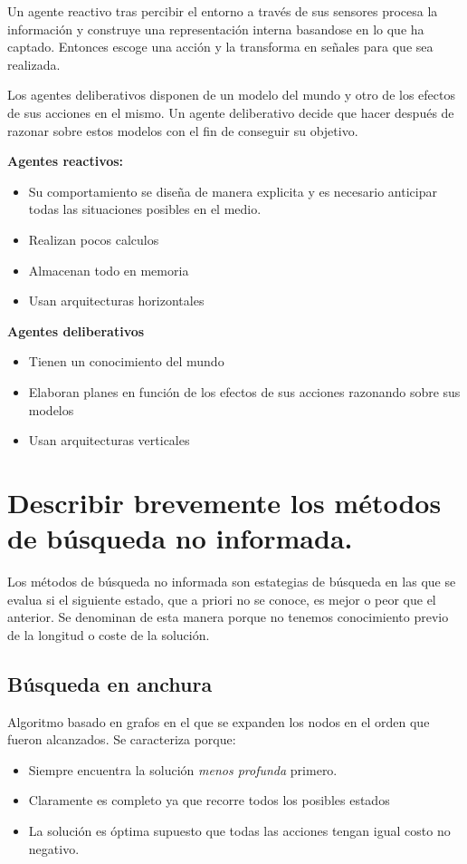 \documentclass[12pt]{article}
\begin{document}
Un agente reactivo tras percibir el entorno a través de sus sensores
procesa la información y construye una representación interna
basandose en lo que ha captado. Entonces escoge una acción y la
transforma en señales para que sea realizada.

Los agentes deliberativos disponen de un modelo del mundo y otro de
los efectos de sus acciones en el mismo. Un agente deliberativo decide
que hacer después de razonar sobre estos modelos con el fin de
conseguir su objetivo.

\textbf{Agentes reactivos:}
\begin{itemize}
\item Su comportamiento se diseña de manera explicita y es necesario
  anticipar todas las situaciones posibles en el medio.
\item Realizan pocos calculos
\item Almacenan todo en memoria
\item Usan arquitecturas horizontales
\end{itemize}

\textbf{Agentes deliberativos}
\begin{itemize}
\item Tienen un conocimiento del mundo
\item Elaboran planes en función de los efectos de sus acciones razonando sobre sus modelos
\item Usan arquitecturas verticales
\end{itemize}

\section{Describir brevemente los métodos de búsqueda no informada.}

Los métodos de búsqueda no informada son estategias de búsqueda en las
que se evalua si el siguiente estado, que a priori no se conoce, es
mejor o peor que el anterior. Se denominan de esta manera porque no
tenemos conocimiento previo de la longitud o coste de la solución.

\subsection{Búsqueda en anchura}

Algoritmo basado en grafos en el que se expanden los nodos en el orden
que fueron alcanzados. Se caracteriza porque:

\begin{itemize}
\item Siempre encuentra la solución \textit{menos profunda} primero.
\item Claramente es completo ya que recorre todos los posibles estados
\item La solución es óptima supuesto que todas las acciones tengan
  igual costo no negativo.
\end{itemize}
\end{document}

